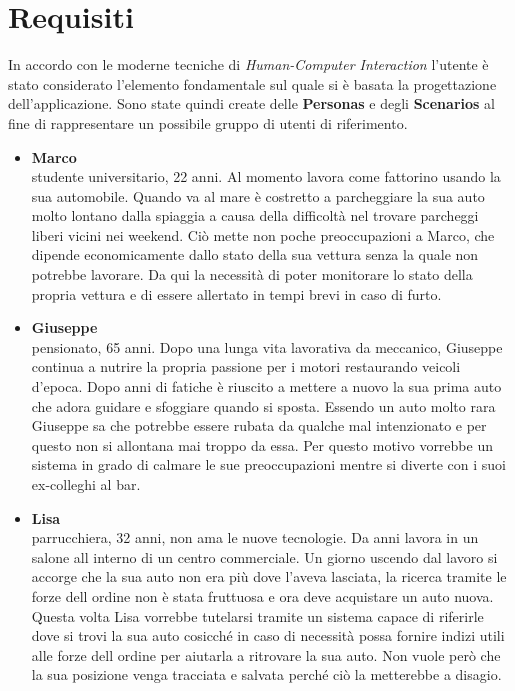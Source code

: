 \documentclass{report}
\begin{document}
\section{Requisiti}
In accordo con le moderne tecniche di \textit{Human-Computer Interaction} l'utente è stato considerato l'elemento fondamentale sul quale si è basata la progettazione dell'applicazione. Sono state quindi create delle \textbf{Personas} e degli \textbf{Scenarios} al fine di rappresentare un possibile gruppo di utenti di riferimento.
\begin{itemize}
    \item \textbf{Marco}\\studente universitario, 22 anni. Al momento lavora come fattorino usando la sua automobile. Quando va al mare è costretto a parcheggiare la sua auto molto lontano dalla spiaggia a causa della difficoltà nel trovare parcheggi liberi vicini nei weekend. Ciò mette non poche preoccupazioni a Marco, che dipende economicamente dallo stato della sua vettura senza la quale non potrebbe lavorare. Da qui la necessità di poter monitorare lo stato della propria vettura e di essere allertato in tempi brevi in caso di furto. 
    
    \item \textbf{Giuseppe}\\pensionato, 65 anni. Dopo una lunga vita lavorativa da meccanico, Giuseppe continua a nutrire la propria passione per i motori restaurando veicoli d'epoca. Dopo anni di fatiche è riuscito a mettere a nuovo la sua prima auto che adora guidare e sfoggiare quando si sposta. Essendo un auto molto rara Giuseppe sa che potrebbe essere rubata da qualche mal intenzionato e per questo non si allontana mai troppo da essa. Per questo motivo vorrebbe un sistema in grado di calmare le sue preoccupazioni mentre si diverte con i suoi ex-colleghi al bar.
    
    \item \textbf{Lisa}\\parrucchiera, 32 anni, non ama le nuove tecnologie. Da anni lavora in un salone all interno di un centro commerciale. Un giorno uscendo dal lavoro si accorge che la sua auto non era più dove l'aveva lasciata, la ricerca tramite le forze dell ordine non è stata fruttuosa e ora deve acquistare un auto nuova. Questa volta Lisa vorrebbe tutelarsi tramite un sistema capace di riferirle dove si trovi la sua auto cosicché in caso di necessità possa fornire indizi utili alle forze dell ordine per aiutarla a ritrovare la sua auto. Non vuole però che la sua posizione venga tracciata e salvata perché ciò la metterebbe a disagio.
\end{itemize}
\end{document}
